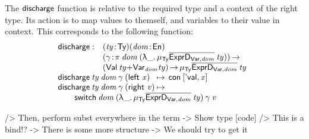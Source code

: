 The $\discharge$ function is relative to the required type and a
context of the right type. Its action is to map values to themself,
and variables to their value in context. This corresponds to the
following function:
%
\[\stk{
\begin{array}{@{}ll}
\discharge : & \PITEL{\V{ty}}{\Ty}
               \PITEL{\V{dom}}{\EnumU} \\
             & \PI{\V{\gamma}}{\spi{\V{dom}}{(\LAM{\_} \IMu{\Ty}{\toIDesc{\HExprVarD{\V{dom}}}}{\V{ty}})}} \\
             & (\SUM{\Val{\V{ty}}}{\Var{\V{dom}}{\V{ty}}}) \To
               \IMu{\Ty}{\toIDesc{\HExprVarD{\V{dom}}}}{\V{ty}} 
\end{array} \\
\begin{array}{@{}l@{\:\mapsto\:\:}l}
\discharge\: \V{ty}\: \V{dom}\: \V{\gamma}\: (\SumLeft \V{x})  & \Con{\pair{\SYMBEval}{\V{x}}{}} \\
\discharge\: \V{ty}\: \V{dom}\: \V{\gamma}\: (\SumRight \V{v}) &
\end{array}\\
\qquad\switch{\V{dom}}{(\LAM{\_}
\IMu{\Ty}{\toIDesc{\HExprVarD{\V{dom}}}}{\V{ty}})}{\V{\gamma}}{\V{v}}
}\]

\begin{wstructure}
            /> Then, perform subst everywhere in the term
                -> Show type [code]
                /> This is a bind!?
                -> There is some more structure 
                    -> We should try to get it
\end{wstructure}

\newcommand{\substH}{\F{substExpr}}
\newcommand{\domNat}{dom_{\CN{nat}}}
\newcommand{\domBool}{dom_{\CN{bool}}}
\newcommand{\gammaNat}{\V{\ensuremath{\gamma_{\CN{nat}}}}}
\newcommand{\gammaBool}{\V{\ensuremath{\gamma_{\CN{bool}}}}}
\newcommand{\SYMBGammaSpi}{\F{\ensuremath{\Gamma_{\CN{ty}}}}\xspace}
\newcommand{\GammaSpi}[2]{\SYMBGammaSpi\: #1\: #2}


